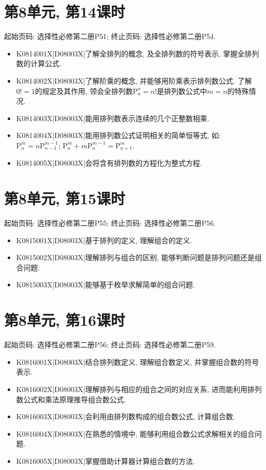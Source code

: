 \section*{第8单元, 第14课时}
起始页码: 选择性必修第二册P51; 终止页码: 选择性必修第二册P54.
\begin{itemize}
\item K0814001X|D08003X|了解全排列的概念, 及全排列数的符号表示, 掌握全排列数的计算公式.
\item K0814002X|D08003X|了解阶乘的概念, 并能够用阶乘表示排列数公式. 了解$0!=1$的规定及其作用, 领会全排列数$\mathrm{P}_n^n=n!$是排列数公式中$m=n$的特殊情况.
\item K0814003X|D08003X|能用排列数表示连续的几个正整数相乘.
\item K0814004X|D08003X|能用排列数公式证明相关的简单恒等式, 如: $\mathrm{P}_n^m=n\mathrm{P}_{n-1}^{m-1}$; $\mathrm{P}_n^m+m\mathrm{P}_n^{m-1}=\mathrm{P}_{n+1}^m$.
\item K0814005X|D08003X|会将含有排列数的方程化为整式方程.
\end{itemize}

\section*{第8单元, 第15课时}
起始页码: 选择性必修第二册P55; 终止页码: 选择性必修第二册P56.
\begin{itemize}
\item K0815001X|D08003X|基于排列的定义, 理解组合的定义.
\item K0815002X|D08003X|理解排列与组合的区别, 能够判断问题是排列问题还是组合问题.
\item K0815003X|D08003X|能够基于枚举求解简单的组合问题.
\end{itemize}

\section*{第8单元, 第16课时}
起始页码: 选择性必修第二册P56; 终止页码: 选择性必修第二册P59.
\begin{itemize}
\item K0816001X|D08003X|结合排列数定义, 理解组合数定义, 并掌握组合数的符号表示.
\item K0816002X|D08003X|理解排列与相应的组合之间的对应关系, 进而能利用排列数公式和乘法原理推导组合数公式.
\item K0816003X|D08003X|会利用由排列数构成的组合数公式, 计算组合数.
\item K0816004X|D08003X|在熟悉的情境中, 能够利用组合数公式求解相关的组合问题.
\item K0816005X|D08003X|掌握借助计算器计算组合数的方法.
\end{itemize}

